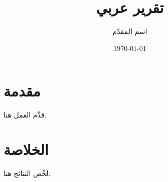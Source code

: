 \documentclass[12pt]{report}
\title{تقرير عربي}
\author{اسم المقدّم}
\date{\today}
\begin{document}
\maketitle
\tableofcontents

\chapter{مقدمة}
قدِّم العمل هنا.

\chapter{الخلاصة}
لخِّص النتائج هنا.

% 
\end{document}
